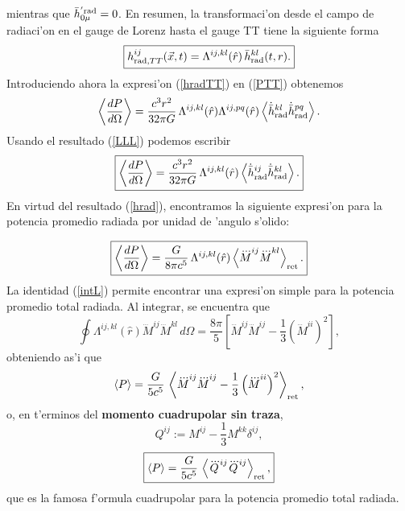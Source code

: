 mientras que $\bar{h}^{'\rm rad}_{0\mu}=0$. En resumen, la transformaci'on desde el campo de radiaci'on en el gauge de Lorenz hasta el gauge TT tiene la siguiente forma
\begin{equation}\label{hradTT}
\boxed{h_{{\rm rad}, TT}^{ij}(\vec{x},t)= \Lambda^{ij,kl}(\hat{r})\,\bar{h}_{\rm rad}^{kl}(t,r).}
\end{equation}
Introduciendo ahora la expresi'on (\ref{hradTT})  en  (\ref{PTT}) obtenemos
\begin{equation}\label{PGL}
\left\langle\frac{d P}{d\Omega}\right\rangle=\frac{c^3r^2}{32\pi G}\, \Lambda^{ij,kl}(\hat{r})\Lambda^{ij,pq}(\hat{r})\left\langle\dot{\bar{h}}_{\rm rad}^{kl}\dot{\bar{h}}_{\rm rad}^{pq}\right\rangle.
\end{equation}
Usando el resultado (\ref{LLL}) podemos escribir
\begin{equation}\label{PGL2}
\boxed{\left\langle\frac{d P}{d\Omega}\right\rangle=\frac{c^3r^2}{32\pi G}\, \Lambda^{ij,kl}(\hat{r})\left\langle\dot{\bar{h}}_{\rm rad}^{ij}\dot{\bar{h}}_{\rm rad}^{kl}
\right\rangle.}
\end{equation}
En virtud del resultado (\ref{hrad}), encontramos la siguiente expresi'on para la potencia promedio radiada por unidad de 'angulo s'olido:

\begin{equation}\label{PGL3}
\boxed{\left\langle\frac{d P}{d\Omega}\right\rangle=\frac{G}{8\pi c^5}\, \Lambda^{ij,kl}(\hat{r})\left\langle\dddot{M}^{ij}\dddot{M}^{kl}\right\rangle_{\rm ret} .}
\end{equation}
La identidad (\ref{intL}) permite encontrar una expresi'on simple para la potencia promedio total radiada. Al integrar, se encuentra que
\begin{equation}\label{intLII}
\oint\Lambda^{ij,kl}(\hat{r})\dddot{M}^{ij}
\dddot{M}^{kl}\,d\Omega=\frac{8\pi}{5}\left[\dddot{M}^{ij}\dddot{M}^{ij}-\frac{1}{3}(\dddot{M}^{ii})^2\right],
\end{equation}
obteniendo as'i que
\begin{equation}\label{PII}
\left\langle P\right\rangle =\frac{G}{5c^5}\, \left\langle \dddot{M}^{ij}\dddot{M}^{ij}-\frac{1}{3}\left(\dddot{M}^{ii}\right)^2\right\rangle_{\rm ret},
\end{equation}
o, en t'erminos del \textbf{momento cuadrupolar sin traza},
\begin{equation}\label{Qij}
Q^{ij}:=M^{ij}-\frac{1}{3}M^{kk}\delta^{ij},
\end{equation}
\begin{equation}\label{PTTQ}
\boxed{\left\langle P\right\rangle=\frac{G}{5c^5}\, \left\langle \dddot{Q}^{ij}\dddot{Q}^{ij}\right\rangle_{\rm ret} ,}
\end{equation}
que es la famosa f'ormula cuadrupolar para la potencia promedio total radiada.

